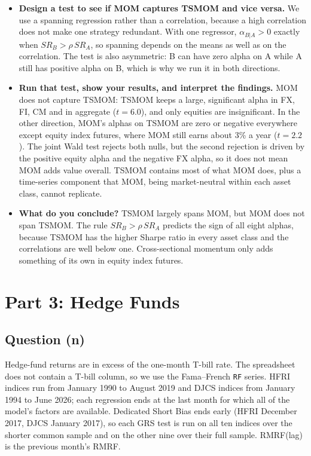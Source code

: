 \documentclass[11pt]{article}
\begin{document}
\begin{itemize}
\item \textbf{Design a test to see if MOM captures TSMOM and vice versa.} We use a spanning
regression rather than a correlation, because a high correlation does not make one strategy
redundant. With one regressor, $\alpha_{B|A}>0$ exactly when $SR_B>\rho\,SR_A$, so spanning
depends on the means as well as on the correlation. The test is also asymmetric: B can have
zero alpha on A while A still has positive alpha on B, which is why we run it in both
directions.

\item \textbf{Run that test, show your results, and interpret the findings.} MOM does not
capture TSMOM: TSMOM keeps a large, significant alpha in FX, FI, CM and in aggregate
($t=6.0$), and only equities are insignificant. In the other direction, MOM's alphas on
TSMOM are zero or negative everywhere except equity index futures, where MOM still earns
about 3\% a year ($t=2.2$). The joint Wald test rejects both nulls, but the second rejection
is driven by the positive equity alpha and the negative FX alpha, so it does not mean MOM
adds value overall. TSMOM contains most of what MOM does, plus a time-series component that
MOM, being market-neutral within each asset class, cannot replicate.

\item \textbf{What do you conclude?} TSMOM largely spans MOM, but MOM does not span TSMOM.
The rule $SR_B>\rho\,SR_A$ predicts the sign of all eight alphas, because TSMOM has the
higher Sharpe ratio in every asset class and the correlations are well below one.
Cross-sectional momentum only adds something of its own in equity index futures.
\end{itemize}

\section*{Part 3: Hedge Funds}
\subsection*{Question (n)}

Hedge-fund returns are in excess of the one-month T-bill rate. The spreadsheet does not
contain a T-bill column, so we use the Fama--French \texttt{RF} series. HFRI indices run
from January 1990 to August 2019 and DJCS indices from January 1994 to June 2026; each
regression ends at the last month for which all of the model's factors are available.
Dedicated Short Bias ends early (HFRI December 2017, DJCS January 2017), so each GRS test is
run on all ten indices over the shorter common sample and on the other nine over their full
sample. RMRF(lag) is the previous month's RMRF.
\end{document}
